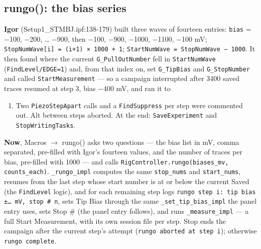 \subsection{rungo(): the bias series}

\textbf{Igor} (Setup1\_STMBJ.ipf:138-179) built three waves of fourteen entries: \texttt{bias} = −100, −200, \ldots{} −900, then −100, −900, −1000, −1100, −100 mV; \texttt{Stop\discretionary{}{}{}Num\discretionary{}{}{}Wave[i] = (i+1) × 1000 + 1}; \texttt{Start\discretionary{}{}{}Num\discretionary{}{}{}Wave = Stop\discretionary{}{}{}Num\discretionary{}{}{}Wave − 1000}. It then found where the current \texttt{G\_\discretionary{}{}{}Pull\discretionary{}{}{}Out\discretionary{}{}{}Number} fell in \texttt{Start\discretionary{}{}{}Num\discretionary{}{}{}Wave} (\texttt{Find\discretionary{}{}{}Level/\discretionary{}{}{}EDGE=1}) and, from that index on, set \texttt{G\_\discretionary{}{}{}Tip\discretionary{}{}{}Bias} and \texttt{G\_\discretionary{}{}{}Stop\discretionary{}{}{}Number} and called \texttt{Start\discretionary{}{}{}Measurement} --- so a campaign interrupted after 3400 saved traces resumed at step 3, bias −400 mV, and ran it to
\begin{enumerate}[leftmargin=*]
\item Two \texttt{Piezo\discretionary{}{}{}Step\discretionary{}{}{}Apart} calls and a \texttt{Find\discretionary{}{}{}Suppress} per step were commented out. Alt between steps aborted. At the end: \texttt{Save\discretionary{}{}{}Experiment} and \texttt{Stop\discretionary{}{}{}Writing\discretionary{}{}{}Tasks}.
\end{enumerate}

\textbf{Now}, Macros $\rightarrow$ rungo() asks two questions --- the bias list in mV, comma separated, pre-filled with Igor's fourteen values, and the number of traces per bias, pre-filled with 1000 --- and calls \texttt{Rig\discretionary{}{}{}Controller.\discretionary{}{}{}rungo(biases\_\discretionary{}{}{}mv,\discretionary{}{}{} counts\_\discretionary{}{}{}each)}. \texttt{\_\discretionary{}{}{}rungo\_\discretionary{}{}{}impl} computes the same \texttt{stop\_\discretionary{}{}{}nums} and \texttt{start\_\discretionary{}{}{}nums}, resumes from the last step whose start number is at or below the current Saved (the \texttt{Find\discretionary{}{}{}Level} logic), and for each remaining step logs \texttt{rungo step i: tip bias ±… m\discretionary{}{}{}V,\discretionary{}{}{} stop \# n}, sets Tip Bias through the same \texttt{\_\discretionary{}{}{}set\_\discretionary{}{}{}tip\_\discretionary{}{}{}bias\_\discretionary{}{}{}impl} the panel entry uses, sets Stop \# (the panel entry follows), and runs \texttt{\_\discretionary{}{}{}measure\_\discretionary{}{}{}impl} --- a full Start Measurement, with its own session file per step. Stop ends the campaign after the current step's attempt (\texttt{rungo aborted at step i}); otherwise \texttt{rungo complete}.

